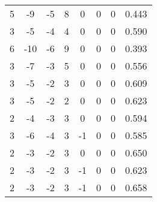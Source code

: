 \documentclass[a4paper, 12pt]{article}
\begin{document}
\begin{table}[H]
\begin{tabular}{@{}cccccccc@{}}
    5                      & -9                     & -5                     & 8                      & 0                 & 0                 & 0                 & 0.443               \\
    3                      & -5                     & -4                     & 4                      & 0                 & 0                 & 0                 & 0.590               \\
    6                      & -10                    & -6                     & 9                      & 0                 & 0                 & 0                 & 0.393               \\
    3                      & -7                     & -3                     & 5                      & 0                 & 0                 & 0                 & 0.556               \\
    3                      & -5                     & -2                     & 3                      & 0                 & 0                 & 0                 & 0.609               \\
    3                      & -5                     & -2                     & 2                      & 0                 & 0                 & 0                 & 0.623               \\
    2                      & -4                     & -3                     & 3                      & 0                 & 0                 & 0                 & 0.594               \\
    3                      & -6                     & -4                     & 3                      & -1                & 0                 & 0                 & 0.585               \\
    2                      & -3                     & -2                     & 3                      & 0                 & 0                 & 0                 & 0.650               \\
    2                      & -3                     & -2                     & 3                      & -1                & 0                 & 0                 & 0.623               \\
    2                      & -3                     & -2                     & 3                      & -1                & 0                 & 0                 & 0.658               \\ \bottomrule
    \end{tabular}
    \end{table}
\end{document}
